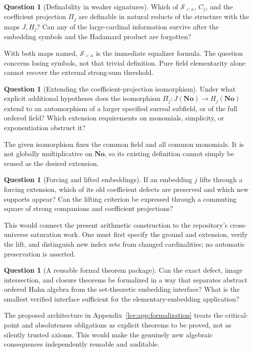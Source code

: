 \documentclass[11pt,letterpaper]{article}
\numberwithin{equation}{section}
\theoremstyle{definition}
\newtheorem{question}[theorem]{Question}
\theoremstyle{remark}
\newcommand{\No}{\mathbf{No}}
\newcommand{\Sk}{\mathscr S_{<\kappa}}
\newcommand{\Common}{C_j}
\begin{document}
\begin{question}[Definability in weaker signatures]\label{lce:q:definability}
Which of $\Sk$, $\Common$, and the coefficient projection $\Pi_j$ are
definable in natural reducts of the structure with the maps $J,H_j$?
Can any of the large-cardinal information survive after the embedding
symbols and the Hadamard product are forgotten?
\end{question}
With both maps named, $\Sk$ is the immediate equalizer formula. The
question concerns losing symbols, not that trivial definition. Pure
field elementarity alone cannot recover the external strong-sum threshold.

\begin{question}[Extending the coefficient-projection isomorphism]\label{lce:q:projection}
Under what explicit additional hypotheses does the isomorphism
$\Pi_j:J(\No)\to H_j(\No)$ extend to an automorphism of a larger
specified surreal subfield, or of the full ordered field? Which extension
requirements on monomials, simplicity, or exponentiation obstruct it?
\end{question}
The given isomorphism fixes the common field and all common monomials.
It is not globally multiplicative on $\No$, so its existing definition
cannot simply be reused as the desired extension.

\begin{question}[Forcing and lifted embeddings]\label{lce:q:forcing}
If an embedding $j$ lifts through a forcing extension, which of its old
coefficient defects are preserved and which new supports appear? Can the
lifting criterion be expressed through a commuting square of strong
companions and coefficient projections?
\end{question}
This would connect the present arithmetic construction to the repository's
cross-universe saturation work. One must first specify the ground and
extension, verify the lift, and distinguish new index sets from changed
cardinalities; no automatic preservation is asserted.

\begin{question}[A reusable formal theorem package]\label{lce:q:formal}
Can the exact defect, image intersection, and closure theorems be formalized
in a way that separates abstract ordered Hahn algebra from the set-theoretic
embedding interface? What is the smallest verified interface sufficient
for the elementary-embedding application?
\end{question}
The proposed architecture in Appendix~\ref{lce:app:formalization} treats the
critical-point and absoluteness obligations as explicit theorems to be
proved, not as silently trusted axioms. This would make the genuinely
new algebraic consequences independently reusable and auditable.
\end{document}
